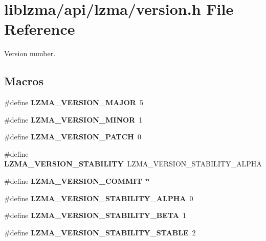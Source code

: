 \section{liblzma/api/lzma/version.h File Reference}
\label{version_8h}


Version number.  


\subsection*{Macros}
\begin{DoxyCompactItemize}
\item 
\#define {\bfseries L\-Z\-M\-A\-\_\-\-V\-E\-R\-S\-I\-O\-N\-\_\-\-M\-A\-J\-O\-R}~5\label{version_8h_aa0f450c9d3b0ff5f88b55888ed55701f}

\item 
\#define {\bfseries L\-Z\-M\-A\-\_\-\-V\-E\-R\-S\-I\-O\-N\-\_\-\-M\-I\-N\-O\-R}~1\label{version_8h_af8fd295cf8aa349b0731423ad7a56134}

\item 
\#define {\bfseries L\-Z\-M\-A\-\_\-\-V\-E\-R\-S\-I\-O\-N\-\_\-\-P\-A\-T\-C\-H}~0\label{version_8h_a8b550373cbff381f15d4308b852a3c2a}

\item 
\#define {\bfseries L\-Z\-M\-A\-\_\-\-V\-E\-R\-S\-I\-O\-N\-\_\-\-S\-T\-A\-B\-I\-L\-I\-T\-Y}~L\-Z\-M\-A\-\_\-\-V\-E\-R\-S\-I\-O\-N\-\_\-\-S\-T\-A\-B\-I\-L\-I\-T\-Y\-\_\-\-A\-L\-P\-H\-A\label{version_8h_ae289abe5dcc203c7cda9f6a9a2f36b3a}

\item 
\#define {\bfseries L\-Z\-M\-A\-\_\-\-V\-E\-R\-S\-I\-O\-N\-\_\-\-C\-O\-M\-M\-I\-T}~\char`\"{}\char`\"{}\label{version_8h_a7fd6169ff15ac7f01f94970359a331ea}

\item 
\#define {\bfseries L\-Z\-M\-A\-\_\-\-V\-E\-R\-S\-I\-O\-N\-\_\-\-S\-T\-A\-B\-I\-L\-I\-T\-Y\-\_\-\-A\-L\-P\-H\-A}~0\label{version_8h_a5bc145ed7d9149eadb77e547ae8f1c5f}

\item 
\#define {\bfseries L\-Z\-M\-A\-\_\-\-V\-E\-R\-S\-I\-O\-N\-\_\-\-S\-T\-A\-B\-I\-L\-I\-T\-Y\-\_\-\-B\-E\-T\-A}~1\label{version_8h_ad53a96c53713062b4380f01fb115cd48}

\item 
\#define {\bfseries L\-Z\-M\-A\-\_\-\-V\-E\-R\-S\-I\-O\-N\-\_\-\-S\-T\-A\-B\-I\-L\-I\-T\-Y\-\_\-\-S\-T\-A\-B\-L\-E}~2\label{version_8h_a97f7ed9e90264388614837baf97a4d3b}


\end{DoxyCompactItemize}
